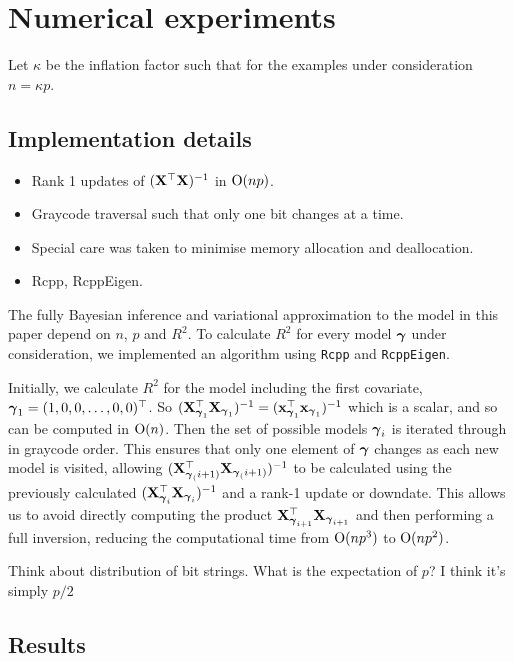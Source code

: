 \documentclass{amsart}[12pt]
\newcommand{\mgc}[1]{{\color{blue}#1}}
\begin{document}
\section{Numerical experiments}
\label{sec:num_exp}

Let $\kappa$ be the inflation factor such that for the examples under consideration $n = \kappa p$.

\subsection{Implementation details}
\label{sec:implementation}

\begin{itemize}
\item Rank 1 updates of $({\bf X}^\top {\bf X})^{-1}$ in $\text{O}(np)$.
\item Graycode traversal such that only one bit changes at a time.
\item Special care was taken to minimise memory allocation and deallocation.
\item Rcpp, RcppEigen.
\end{itemize}

The fully Bayesian inference and variational approximation to the model in this paper depend on $n$, $p$ and
$R^2$. To calculate $R^2$ for every model ${\boldsymbol \gamma}$ under consideration, we implemented an algorithm using
\texttt{Rcpp} and \texttt{RcppEigen}.

Initially, we calculate $R^2$ for the model including the first covariate, ${\boldsymbol \gamma}_1 = (1, 0, 0, \ldots, 0,
0)^\top$. So $({\bf X}_{{\boldsymbol \gamma}_1}^\top {\bf X}_{{\boldsymbol \gamma}_1})^{-1} = ({\bf x}_{{\boldsymbol \gamma}_1}^\top {\bf x}_{{\boldsymbol \gamma}_1})^{-1}$ which
is a scalar, and so can be computed in $\text{O}(n)$. Then the set of possible models ${\boldsymbol \gamma}_i$ is iterated
through in graycode order. This ensures that only one element of ${\boldsymbol \gamma}$ changes as each new model is
visited, allowing $({\bf X}_{{\boldsymbol \gamma}_(i+1)}^\top {\bf X}_{{\boldsymbol \gamma}_(i+1)})^{-1}$ to be calculated using the previously
calculated $({\bf X}_{{\boldsymbol \gamma}_i}^\top {\bf X}_{{\boldsymbol \gamma}_i})^{-1}$ and a rank-1 update or downdate. This allows us to
avoid directly computing the product ${\bf X}_{{\boldsymbol \gamma}_{i+1}}^\top {\bf X}_{{\boldsymbol \gamma}_{i+1}}$ and then performing a full
inversion, reducing the computational time from $\text{O}(n p^3)$  to $\text{O}(n p^2)$.

\mgc{Think about distribution of bit strings. What is the expectation of $p$? I think it's simply $p/2$}

\subsection{Results}
\end{document}
